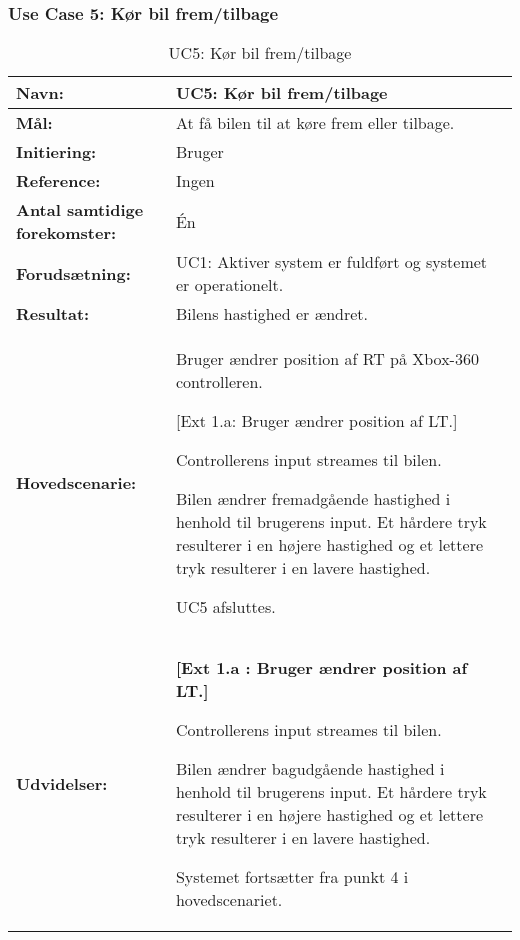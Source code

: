\subsubsection{Use Case 5: Kør bil frem/tilbage}
\begin{table}[h]
\begin{tabularx}{\textwidth}{| L{3.3 cm} | Z |}										 				\hline

\textbf{Navn:} 						& UC5: Kør bil frem/tilbage										\\ \hline
\textbf{Mål:}						& At få bilen til at køre frem eller tilbage. 					\\ \hline
\textbf{Initiering:}				& Bruger 														\\ \hline
\textbf{Reference:} 				& Ingen 														\\ \hline
\textbf{Antal samtidige forekomster:} & Én 															\\ \hline
\textbf{Forudsætning:} 				& UC1: Aktiver system er fuldført og systemet er operationelt. 	\\ \hline
\textbf{Resultat:}					& Bilens hastighed er ændret. 									\\ \hline
\textbf{Hovedscenarie:}				& 

\begin{packed_enum}
	\item Bruger ændrer position af RT på Xbox-360 controlleren.
	\begin{packed_item}\itemsep1pt \parskip0pt 
		\item {[}Ext 1.a: Bruger ændrer position af LT.{]}
	\end{packed_item}
	\item Controllerens input streames til bilen.
	\item Bilen ændrer fremadgående hastighed i henhold til brugerens input. Et hårdere tryk resulterer i en højere hastighed og et lettere tryk resulterer i en lavere hastighed.
	\item UC5 afsluttes.
\end{packed_enum} \\ \hline
\textbf{Udvidelser:}				&  
\textbf{{[}Ext 1.a : Bruger ændrer position af LT.{]}}
	\begin{packed_enum}\itemsep1pt \parskip0pt 
		\item Controllerens input streames til bilen.
		\item Bilen ændrer bagudgående hastighed i henhold til brugerens input. Et hårdere tryk resulterer i en højere hastighed og et lettere tryk resulterer i en lavere hastighed.
		\item Systemet fortsætter fra punkt 4 i hovedscenariet.
	\end{packed_enum}																			\\ \hline
\end{tabularx}
\caption{UC5: Kør bil frem/tilbage}
\label{tbl:UC5}
\end{table}